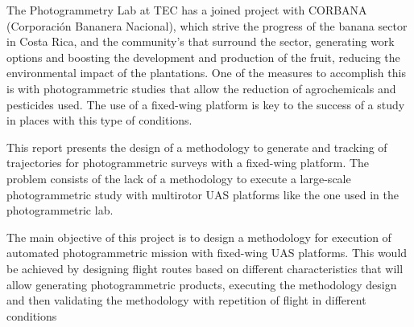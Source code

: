 The Photogrammetry Lab at TEC has a joined project with CORBANA (Corporación Bananera Nacional), which strive the progress of the banana sector in Costa Rica, and the community’s that surround the sector, generating work options and boosting the development and production of the fruit, reducing the environmental impact of the plantations. One of the measures to accomplish this is with photogrammetric studies that allow the reduction of agrochemicals and pesticides used. The use of a fixed-wing platform is key to the success of a study in places with this type of conditions\cite{CORBANA}.

This report presents the design of a methodology to generate and tracking of trajectories for photogrammetric surveys with a fixed-wing platform. The problem consists of the lack of a methodology to execute a large-scale photogrammetric study with multirotor UAS platforms like the one used in the photogrammetric lab. 



The main objective of this project is to design a methodology for execution of automated photogrammetric mission with fixed-wing UAS platforms. This would be achieved by designing flight routes based on different characteristics that will allow generating photogrammetric products, executing the methodology design and then validating the methodology with repetition of flight in different conditions

